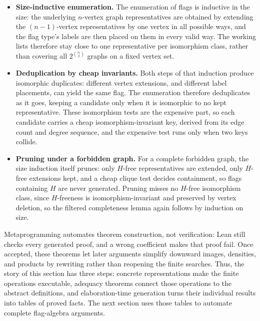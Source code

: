 \documentclass[acmsmall,screen=true,acmthm=false]{acmart}
\begin{document}
\begin{itemize}
\item \textbf{Size-inductive enumeration.}
The enumeration of flags is inductive in the size: the underlying
\(n\)-vertex graph representatives are obtained by extending the
\((n-1)\)-vertex representatives by one vertex in all possible ways, and the
flag type's labels are then placed on them in every valid
way.  The working lists therefore stay
close to one representative per isomorphism class, rather than covering all
\(2^{\binom{n}{2}}\) graphs on a fixed vertex set.

\item \textbf{Deduplication by cheap invariants.}
Both steps of that induction produce isomorphic duplicates: different vertex
extensions, and different label placements, can yield the same flag.  The
enumeration therefore deduplicates as it goes, keeping a candidate only when
it is isomorphic to no kept representative.  These isomorphism tests are the
expensive part, so each candidate carries a cheap isomorphism-invariant key,
derived from its edge count and degree sequence, and the expensive test runs
only when two keys collide.

\item \textbf{Pruning under a forbidden graph.}
For a complete forbidden graph, the size induction itself prunes: only
\(H\)-free representatives are extended, only \(H\)-free extensions kept,
and a cheap clique test decides containment, so flags containing \(H\) are
never generated.  Pruning misses no \(H\)-free isomorphism
class, since \(H\)-freeness is isomorphism-invariant and preserved by vertex
deletion, so the filtered completeness lemma again follows by
induction on size.

\end{itemize}

Metaprogramming automates theorem construction, not verification: Lean still
checks every generated proof, and a wrong coefficient makes that proof fail.
Once accepted, these theorems let later arguments simplify downward images,
densities, and products by rewriting rather than reopening the finite searches.
Thus, the story of this section has three steps: concrete representations make
the finite operations executable, adequacy theorems connect those operations
to the abstract definitions, and elaboration-time generation turns their
individual results into tables of proved facts.  The next section
uses those tables to automate complete flag-algebra arguments.
\end{document}
